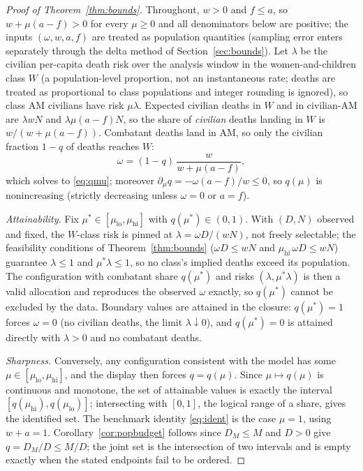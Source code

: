 \begin{proof}[Proof of Theorem~\ref{thm:bounds}]
Throughout, $w>0$ and $f\le a$, so $w+\mu(a-f)>0$ for every $\mu\ge 0$ and all denominators below are positive; the inputs $(\omega,w,a,f)$ are treated as population quantities (sampling error enters separately through the delta method of Section~\ref{sec:bounds}). Let $\lambda$ be the civilian per-capita death risk over the analysis window in the women-and-children class $W$ (a population-level proportion, not an instantaneous rate; deaths are treated as proportional to class populations and integer rounding is ignored), so class $\mathrm{AM}$ civilians have risk $\mu\lambda$. Expected civilian deaths in $W$ and in civilian-$\mathrm{AM}$ are $\lambda w N$ and $\lambda\mu(a-f)N$, so the share of \emph{civilian} deaths landing in $W$ is $w/(w+\mu(a-f))$. Combatant deaths land in $\mathrm{AM}$, so only the civilian fraction $1-q$ of deaths reaches $W$:
\[
\omega=(1-q)\,\frac{w}{w+\mu(a-f)},
\]
which solves to \eqref{eq:qmu}; moreover $\partial_\mu q=-\omega(a-f)/w\le 0$, so $q(\mu)$ is nonincreasing (strictly decreasing unless $\omega=0$ or $a=f$).

\emph{Attainability.} Fix $\mu^\ast\in[\mu_{\mathrm{lo}},\mu_{\mathrm{hi}}]$ with $q(\mu^\ast)\in(0,1)$. With $(D,N)$ observed and fixed, the $W$-class risk is pinned at $\lambda=\omega D/(wN)$, not freely selectable; the feasibility conditions of Theorem~\ref{thm:bounds} ($\omega D\le wN$ and $\mu_{\mathrm{hi}}\,\omega D\le wN$) guarantee $\lambda\le 1$ and $\mu^\ast\lambda\le 1$, so no class's implied deaths exceed its population. The configuration with combatant share $q(\mu^\ast)$ and risks $(\lambda,\mu^\ast\lambda)$ is then a valid allocation and reproduces the observed $\omega$ exactly, so $q(\mu^\ast)$ cannot be excluded by the data. Boundary values are attained in the closure: $q(\mu^\ast)=1$ forces $\omega=0$ (no civilian deaths, the limit $\lambda\downarrow 0$), and $q(\mu^\ast)=0$ is attained directly with $\lambda>0$ and no combatant deaths.

\emph{Sharpness.} Conversely, any configuration consistent with the model has some $\mu\in[\mu_{\mathrm{lo}},\mu_{\mathrm{hi}}]$, and the display then forces $q=q(\mu)$. Since $\mu\mapsto q(\mu)$ is continuous and monotone, the set of attainable values is exactly the interval $[q(\mu_{\mathrm{hi}}),q(\mu_{\mathrm{lo}})]$; intersecting with $[0,1]$, the logical range of a share, gives the identified set. The benchmark identity \eqref{eq:ident} is the case $\mu=1$, using $w+a=1$. Corollary~\ref{cor:popbudget} follows since $D_M\le M$ and $D>0$ give $q=D_M/D\le M/D$; the joint set is the intersection of two intervals and is empty exactly when the stated endpoints fail to be ordered.
\end{proof}

